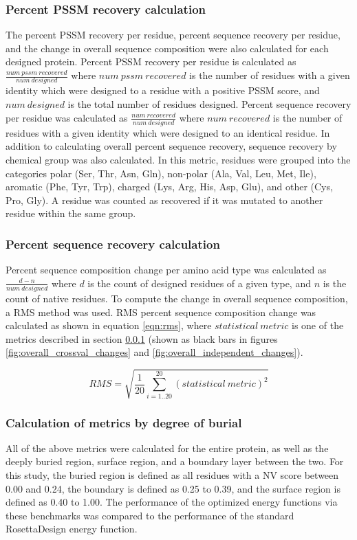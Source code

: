 \subsubsection{Percent \acs{PSSM} recovery calculation}
\label{subsubsec:percent_pssm_calc}
The percent \ac{PSSM} recovery per residue, percent sequence recovery per residue, and the change in overall sequence composition were also calculated for each designed protein.
Percent \ac{PSSM} recovery per residue is calculated as $\frac{num\ pssm\ recovered}{num\ designed}$ where $num\ pssm\ recovered$ is the number of residues with a given identity which were designed to a residue with a positive \ac{PSSM} score, and $num\ designed$ is the total number of residues designed. 
Percent sequence recovery per residue was calculated as $\frac{num\ recovered}{num\ designed}$ where $num\ recovered$ is the number of residues with a given identity which were designed to an identical residue.
In addition to calculating overall percent sequence recovery, sequence recovery by chemical group was also calculated.
In this metric, residues were grouped into the categories polar (Ser, Thr, Asn, Gln), non-polar (Ala, Val, Leu, Met, Ile), aromatic (Phe, Tyr, Trp), charged (Lys, Arg, His, Asp, Glu), and other (Cys, Pro, Gly). 
A residue was counted as recovered if it was mutated to another residue within the same group.

\subsubsection{Percent sequence recovery calculation}
Percent sequence composition change per amino acid type was calculated as $\frac{d-n}{num\ designed}$ where $d$ is the count of designed residues of a given type, and $n$ is the count of native residues.
To compute the change in overall sequence composition, a \ac{RMS} method was used.
\ac{RMS} percent sequence composition change was calculated as shown in equation \ref{eqn:rms}, where $statistical\ metric$ is one of the metrics described in section \ref{subsubsec:percent_pssm_calc} (shown as black bars in figures \ref{fig:overall_crossval_changes} and \ref{fig:overall_independent_changes}).

\begin{equation}
\label{eqn:rms}
RMS=\sqrt{\frac{1}{20}\sum^{20}_{i=1..20}(statistical\ metric)^{2}}
\end{equation}

\subsubsection{Calculation of metrics by degree of burial}
All of the above metrics were calculated for the entire protein, as well as the deeply buried region, surface region, and a boundary layer between the two.
For this study, the buried region is defined as all residues with a \ac{NV} score between 0.00 and 0.24, the boundary is defined as 0.25 to 0.39, and the surface region is defined as 0.40 to 1.00.
The performance of the optimized energy functions via these benchmarks was compared to the performance of the standard RosettaDesign energy function.

